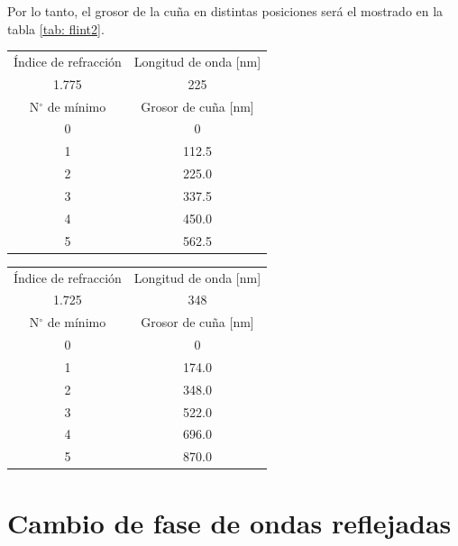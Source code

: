 \documentclass[a4paper,12pt]{article}
\newenvironment{Figure}
  {\par\medskip\noindent\minipage{\linewidth}}
  {\endminipage\par\medskip}
\begin{document}
    \newpage

    Por lo tanto, el grosor de la cuña en distintas posiciones será el mostrado en la tabla \ref{tab: flint2}.

    \begin{Figure}
        \centering

        \begin{tabular}{c|c}
            Índice de refracción & Longitud de onda [nm]\\
            1.775 & 225 \\
            \midrule
            N$^\circ$ de mínimo & Grosor de cuña [nm] \\
            0 & 0 \\
            1 & 112.5 \\
            2 & 225.0 \\
            3 & 337.5 \\
            4 & 450.0 \\
            5 & 562.5 \\
        \end{tabular}

        \label{tab: flint}
    \end{Figure}

    \begin{Figure}
        \centering

        \begin{tabular}{c|c}
            \toprule
            Índice de refracción & Longitud de onda [nm]\\
            1.725 & 348 \\
            \midrule
            N$^\circ$ de mínimo & Grosor de cuña [nm] \\
            0 & 0 \\
            1 & 174.0 \\
            2 & 348.0 \\
            3 & 522.0 \\
            4 & 696.0 \\
            5 & 870.0 \\
        \end{tabular}

        \label{tab: flint2}
    \end{Figure}

\section*{Cambio de fase de ondas reflejadas}
\end{document}
